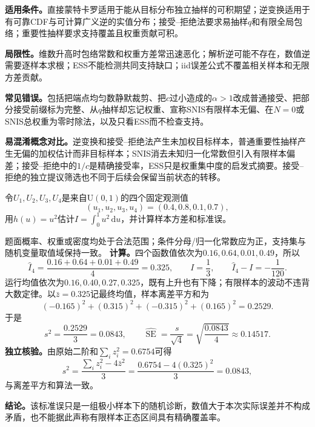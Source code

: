 \label{struct:V5-C02-CH28}
\begin{applicabilitybox}
\textbf{适用条件。}直接蒙特卡罗适用于能从目标分布独立抽样的可积期望；逆变换适用于有可靠CDF与可计算广义逆的实值分布；接受--拒绝法要求易抽样$q$和有限全局包络；重要性抽样要求支持覆盖且权重贡献可积。

\label{struct:V5-C02-CH29}
\textbf{局限性。}维数升高时包络常数和权重方差常迅速恶化；解析逆可能不存在，数值逆需要逐样本求根；ESS不能检测共同支持缺口；iid误差公式不覆盖相关样本和无限方差贡献。

\label{struct:V5-C02-CH30}
\textbf{常见错误。}包括把端点均匀数静默裁剪、把$c$过小造成的$\alpha>1$改成普通接受、把部分接受前缀标为完整、从$q$抽样却忘记权重、宣称SNIS有限样本无偏、在$N=0$或SNIS总权重为零时除法，以及只看ESS而不检查支持。

\label{struct:V5-C02-CH31}
\textbf{易混淆概念对比。}逆变换和接受--拒绝法产生未加权目标样本，普通重要性抽样产生无偏的加权估计而非目标样本；SNIS消去未知归一化常数但引入有限样本偏差；接受--拒绝中的$1/c$是精确接受率，ESS只是权重集中度的启发式摘要。接受--拒绝的独立提议筛选也不同于后续会保留当前状态的\MetropolisHastings{}转移。
\end{applicabilitybox}

\label{struct:V5-C02-CH32}
\begin{example}[固定样本下的蒙特卡罗估计与误差审计]\label{exm:V5-C02-mc-audit}
令$U_1,U_2,U_3,U_4$是来自$\mathrm U(0,1)$的四个固定观测值
\[
(u_1,u_2,u_3,u_4)=(0.4,0.8,0.1,0.7),
\]
用$h(u)=u^2$估计$I=\int_0^1u^2\,\mathrm du$，并计算样本方差和标准误。
\end{example}

\label{struct:V5-C02-CH33}
\begin{solution}
\SolGiven 题面概率、权重或密度均处于合法范围；条件分母/归一化常数应为正，支持集与随机变量取值域保持一致。
\SolDerive
\textbf{计算。}四个函数值依次为$0.16,0.64,0.01,0.49$，所以
\[
\widehat I_4=\frac{0.16+0.64+0.01+0.49}{4}=0.325,
\qquad
I=\frac13,
\qquad
\widehat I_4-I=-\frac1{120}.
\]
运行均值依次为$0.16,0.40,0.27,0.325$，既有上升也有下降；有限样本的波动不违背大数定律。以$\bar z=0.325$记最终均值，样本离差平方和为
\[
(-0.165)^2+(0.315)^2+(-0.315)^2+(0.165)^2=0.2529.
\]
于是
\[
s^2=\frac{0.2529}{3}=0.0843,
\qquad
\widehat{\operatorname{SE}}=\frac{s}{\sqrt4}
=\sqrt{\frac{0.0843}{4}}\approx0.14517.
\]
\textbf{独立核验。}由原始二阶和$\sum_i z_i^2=0.6754$可得
\[
s^2=\frac{\sum_i z_i^2-4\bar z^2}{3}
=\frac{0.6754-4(0.325)^2}{3}=0.0843,
\]
与离差平方和算法一致。

\textbf{结论。}该标准误只是一组极小样本下的随机诊断，数值大于本次实际误差并不构成矛盾，也不能据此声称有限样本正态区间具有精确覆盖率。
\end{solution}

